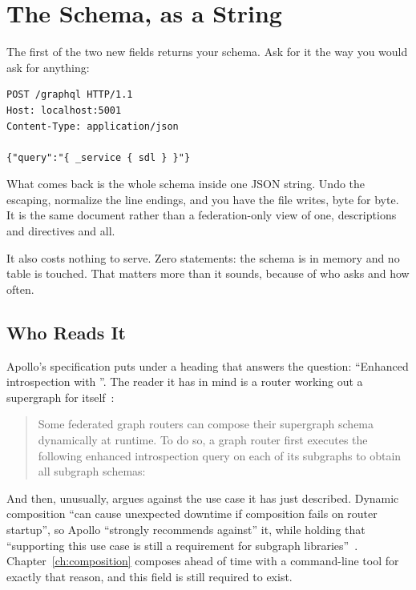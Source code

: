 \section{The Schema, as a String}
\label{sec:ch06-the-schema-as-a-string}

%
The first of the two new fields returns your schema. Ask for it the way you
would ask for anything:

\begin{verbatim}
POST /graphql HTTP/1.1
Host: localhost:5001
Content-Type: application/json

{"query":"{ _service { sdl } }"}
\end{verbatim}

%
What comes back is the whole schema inside one JSON string. Undo the escaping,
normalize the line endings, and you have the file  writes,
byte for byte. It is the same document rather than a federation-only view of
one, descriptions and  directives and all.

%
It also costs nothing to serve. Zero statements: the schema is in memory and no
table is touched. That matters more than it sounds, because of who asks and how
often.

\subsection{Who Reads It}

%
Apollo's specification puts  under a heading that answers the
question: \enquote{Enhanced introspection with }. The
reader it has in mind is a router working out a supergraph for
itself~\autocite{apollosubgraphspec}:

\begin{quote}
Some federated graph routers can compose their supergraph schema dynamically at
runtime. To do so, a graph router first executes the following enhanced
introspection query on each of its subgraphs to obtain all subgraph schemas:
\end{quote}

%
And then, unusually, argues against the use case it has just described. Dynamic
composition \enquote{can cause unexpected downtime if composition fails on
router startup}, so Apollo \enquote{strongly recommends against} it, while
holding that \enquote{supporting this use case is still a requirement for
subgraph libraries}~\autocite{apollosubgraphspec}. Chapter~\ref{ch:composition}
composes ahead of time with a command-line tool for exactly that reason, and
this field is still required to exist.

